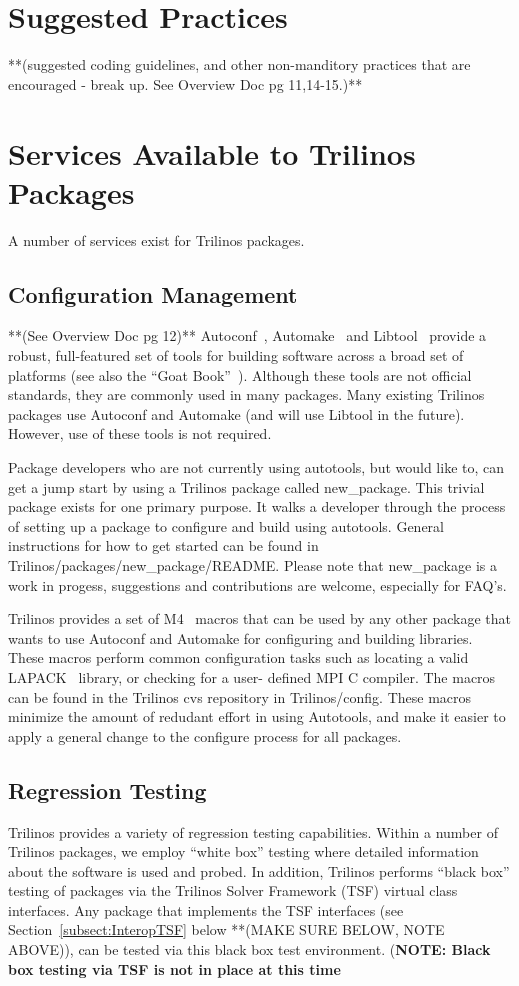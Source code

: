 \documentclass[12pt,relax]{TrilinosDevGuide}
\begin{document}
	\chapter{Suggested Practices}
	**(suggested coding guidelines, and other non-manditory practices that are encouraged - break up.  See Overview Doc pg 11,14-15.)**
	


	\chapter{Services Available to Trilinos Packages}
	A number of services exist for Trilinos packages.
	\section{Configuration Management}
	**(See Overview Doc pg 12)**
Autoconf~\cite{Autoconf},  Automake~\cite{Automake} and
Libtool~\cite{Libtool} provide a robust, full-featured set of tools for
building software across a broad set of platforms (see also the ``Goat
Book''~\cite{GoatBook}).  Although these
tools are not official standards, they are commonly used in many
packages.  Many existing
Trilinos packages use Autoconf and Automake (and will use
Libtool in the future).  However, use of these tools is not required.

Package developers who are not currently using autotools, but would like
to, can get a jump start by using a Trilinos package called 
new_package.  This trivial package exists for one primary 
purpose.  It walks a developer through the process of setting up a 
package to configure and build using autotools.  General instructions for
how to get started can be found in Trilinos/packages/new_package/README.  
Please note that new_package is a work in progess, suggestions and 
contributions are welcome, especially for FAQ's.

Trilinos provides a set of M4~\cite{M4} macros that can be used by any other
package that wants to use Autoconf and Automake for configuring and
building libraries.  These macros perform common configuration tasks such as
locating a valid LAPACK~\cite{lapack} library, or checking for a user-
defined MPI C compiler.  The macros can be found in the Trilinos cvs 
repository in Trilinos/config.  These macros minimize the amount of redudant
 effort in using Autotools, and make it easier to apply a general change to 
the configure process for all packages.
	\section{Regression Testing}
Trilinos provides a variety of regression
testing capabilities.  Within a number of Trilinos packages, we employ
``white box'' testing where detailed information about the software is
used and probed.  In addition, Trilinos performs ``black box'' testing
of packages via the Trilinos Solver Framework (TSF) virtual class
interfaces.  Any package that implements the TSF interfaces (see
Section~\ref{subsect:InteropTSF} below **(MAKE SURE BELOW, NOTE ABOVE)), can be tested via this black box
test environment.  ({\bf NOTE: Black box testing via TSF is not in
place at this time}
\end{document}
